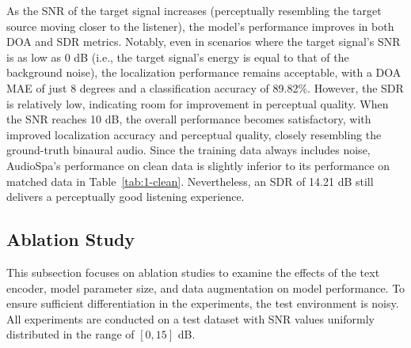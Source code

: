 \documentclass{IEEEtran}
\begin{document}
As the SNR of the target signal increases (perceptually resembling the target source moving closer to the listener), the model's performance improves in both DOA and SDR metrics. Notably, even in scenarios where the target signal's SNR is as low as 0 dB (i.e., the target signal's energy is equal to that of the background noise), the localization performance remains acceptable, with a DOA MAE of just 8 degrees and a classification accuracy of 89.82\%. However, the SDR is relatively low, indicating room for improvement in perceptual quality. When the SNR reaches 10 dB, the overall performance becomes satisfactory, with improved localization accuracy and perceptual quality, closely resembling the ground-truth binaural audio. Since the training data always includes noise, AudioSpa's performance on clean data is slightly inferior to its performance on matched data in Table~\ref{tab:1-clean}. Nevertheless, an SDR of 14.21 dB still delivers a perceptually good listening experience.


\subsection{Ablation Study}
This subsection focuses on ablation studies to examine the effects of the text encoder, model parameter size, and data augmentation on model performance. To ensure sufficient differentiation in the experiments, the test environment is noisy. All experiments are conducted on a test dataset with SNR values uniformly distributed in the range of $[0, 15]$ dB.


\begin{table}[t]
    \centering
    \caption{The impact of different text encoders and token fusion methods on the performance of AudioSpa.}
    \label{tab:abla-text}%
  \end{table}%
\end{document}
